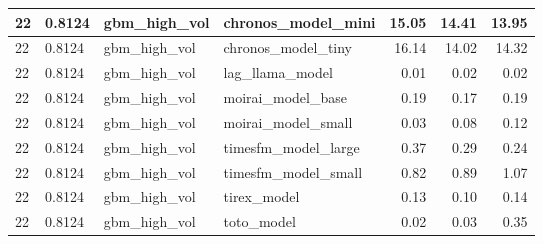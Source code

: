 {\begin{tabular}{llllrrr}
\midrule
22 & 0.8124 & gbm\_high\_vol & chronos\_model\_mini & 15.05 & 14.41 & 13.95 \\
\midrule
22 & 0.8124 & gbm\_high\_vol & chronos\_model\_tiny & 16.14 & 14.02 & 14.32 \\
\midrule
22 & 0.8124 & gbm\_high\_vol & lag\_llama\_model & 0.01 & 0.02 & 0.02 \\
\midrule
22 & 0.8124 & gbm\_high\_vol & moirai\_model\_base & 0.19 & 0.17 & 0.19 \\
\midrule
22 & 0.8124 & gbm\_high\_vol & moirai\_model\_small & 0.03 & 0.08 & 0.12 \\
\midrule
22 & 0.8124 & gbm\_high\_vol & timesfm\_model\_large & 0.37 & 0.29 & 0.24 \\
\midrule
22 & 0.8124 & gbm\_high\_vol & timesfm\_model\_small & 0.82 & 0.89 & 1.07 \\
\midrule
22 & 0.8124 & gbm\_high\_vol & tirex\_model & 0.13 & 0.10 & 0.14 \\
\midrule
22 & 0.8124 & gbm\_high\_vol & toto\_model & 0.02 & 0.03 & 0.35 \\
\bottomrule
\end{tabular}
}